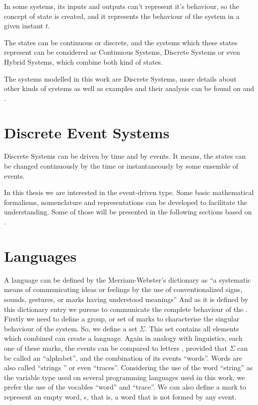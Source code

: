 In some systems, its inputs and outputs can't represent it's behaviour, so the
concept of state is created, and it represents the behaviour of the system in a
given instant $t$.

The states can be continuous or discrete, and the systems which these states
represent can be considered as Continuous Systems, Discrete Systems or even
Hybrid Systems, which combine both kind of states.

The systems modelled in this work are Discrete Systems, more details about other
kinds of systems as well as examples and their analysis can be found on
\cite{oppenheim1996signals} and \cite{kalouptsidis1997signal}.
\section{Discrete Event Systems}
\label{sec:discreteEventSystems}
Discrete Systems can be driven by time and by events. It means, the states can
be changed continuously by the time or instantaneously by some ensemble of events.

In this thesis we are interested in the event-driven type. Some basic mathematical
formalisms, nomenclature and representations can be developed to facilitate the
understanding. Some of those will be presented in the following sections based
on \cite{cassandras2009introduction, david2005discrete,david1989grafcet}.
\section{Languages} \label{sec:automata} A language can be defined by the Merriam-Webster's dictionary as ``a systematic
means of communicating ideas or feelings by the use of conventionalized signs,
sounds, gestures, or marks having understood meanings'' And as it is defined by
this dictionary entry we pursue to communicate the complete behaviour of the
\DES. Firstly we need to define a group, or set of marks to characterise the
singular behaviour of the system. So, we define a set $\Sigma$. This set contains
all elements which combined can create a language. Again in analogy with
linguistics, each one of these marks, the events can be compared to letters ,
provided that $\Sigma$ can be called an ``alphabet'', and the combination of its
events ``words''. Words are also called ``strings '' or even ``traces''.
Considering the use of the word ``string'' as the variable type used on several
programming languages used in this work, we prefer the use of the vocables
``word'' and ``trace''. We can also define a mark to represent an empty word,
$\epsilon$, that is, a word that is not formed by any event.

